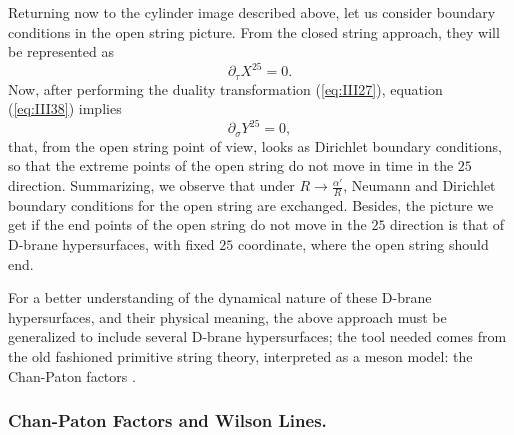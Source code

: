Returning now to the cylinder image described above, let us consider 
boundary conditions in the open string picture. From the closed string 
approach, they will be represented as
\begin{equation}
\partial_{\tau} X^{25} =0.
\label{eq:III39}
\end{equation}
Now, after performing the duality transformation
(\ref{eq:III27}), equation (\ref{eq:III38}) implies
\begin{equation}
\partial_{\sigma} Y^{25} =0,
\label{eq:III40}
\end{equation}
that, from the open string point of view, looks as Dirichlet
boundary conditions, so that the extreme points of the open
string do not move in time in the $25$ direction. Summarizing, we
observe that under $R \rightarrow \frac {\alpha'}{R}$, Neumann
and Dirichlet boundary conditions for the open string are
exchanged. Besides, the picture we get if the end points
of the open string do not move in the $25$ direction is that of
D-brane hypersurfaces, with fixed $25$ coordinate, where the open
string should end.
  
For a better understanding of the dynamical nature of these D-brane
hypersurfaces, and their physical meaning, the above approach
must be generalized to include several D-brane hypersurfaces; the
tool needed comes from the old fashioned primitive string theory,
interpreted as a meson model: the Chan-Paton factors \cite{Chan-Paton}.


\subsubsection{Chan-Paton Factors and Wilson Lines.}

